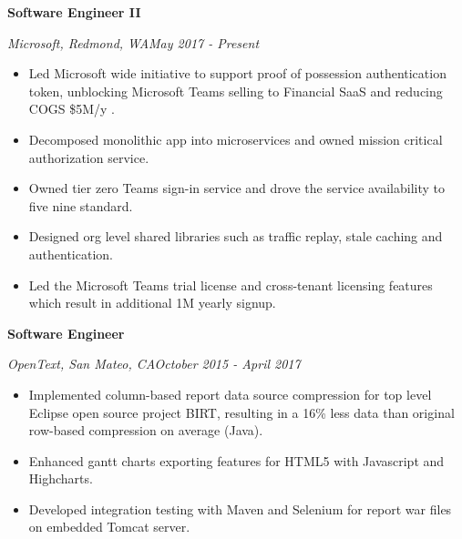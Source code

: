 \documentclass[3pt]{article}
\newenvironment{changemargin}[2]{%
  \begin{list}{}{%
    \setlength{\topsep}{0pt}%
    \setlength{\leftmargin}{#1}%
    \setlength{\rightmargin}{#2}%
    \setlength{\listparindent}{\parindent}%
    \setlength{\itemindent}{\parindent}%
    \setlength{\parsep}{\parskip}%
  }%
  \item[]}{\end{list}
}
\newenvironment{body} {
	\vspace*{-16pt}
	\begin{changemargin}{-0.25in}{-0.5in}
  }	
	{\end{changemargin}
}
\begin{document}
\begin{body}
	\vspace{17pt}
	
   \textbf{Software Engineer II} \\
   \vspace{1pt}

    \emph{Microsoft, Redmond, WA}\hfill \emph{May 2017 - Present}\\
     \begin{itemize} \itemsep -0.5pt
    \item {Led Microsoft wide initiative to support proof of possession authentication token, unblocking Microsoft Teams selling to Financial SaaS and reducing COGS \$5M/y .}
    \item {Decomposed monolithic app into microservices and owned mission critical authorization service.}
    \item {Owned tier zero Teams sign-in service and drove the service availability to five nine standard.}
     \item {Designed org level shared libraries such as traffic replay, stale caching and authentication.} 
     \item {Led the Microsoft Teams trial license and cross-tenant licensing features which result in additional 1M yearly signup.}
     \end{itemize}

    \textbf{Software Engineer} \\
   \vspace{1pt}

    \emph{OpenText, San Mateo, CA}\hfill \emph{October 2015 - April 2017}\\
     \begin{itemize} \itemsep -0.5pt
    \item{Implemented column-based report data source compression for top level Eclipse open source project BIRT, resulting in a 16\% less data than original row-based compression on average (Java).}
     \item {Enhanced gantt charts exporting features for HTML5 with Javascript and Highcharts. } 
     \item {Developed integration testing with Maven and Selenium for report war files on embedded Tomcat server. } 
       \end{itemize}
	
   \vspace{5pt}


\end{body}
\end{document}
